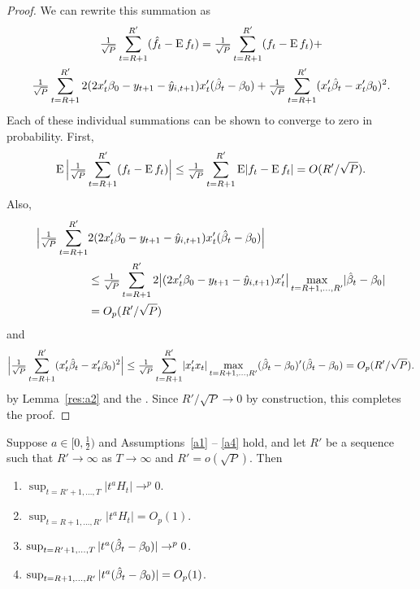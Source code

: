\documentclass[12pt,fleqn]{article}
\begin{document}
\begin{proof}
  We can rewrite this summation as
  \begin{multline*}
    \ocltc{t} (\fh_t - \E f_t) = \ocltc{t} (f_t - \E f_t) + \\
    \ocltc{t} 2 (2 x_t'\btrue - y_{t+1} - \yh_{i,t+1}) x_t'(\bh_t - \btrue)
    + \ocltc{t} (x_t'\bh_t - x_t'\btrue)^2.
  \end{multline*}
  Each of these individual summations can be shown to converge to
  zero in probability. First,
  \begin{equation*}
    \operatorname{E} \Big\lvert \tfrac{1}{\sqrt{P}} \sum_{t=R+1}^{R'} (f_t - \operatorname{E} f_t) \Big\rvert
    \leq \tfrac{1}{\sqrt{P}} \sum_{t=R+1}^{R'} \operatorname{E}\lvert f_t - \operatorname{E} f_t \rvert
    = O(R'/\sqrt{P}).
  \end{equation*}
  Also,
  \begin{align*}
    \Big\lvert \ocltc{t} &2 (2 x_t'\btrue - y_{t+1} - \yh_{i,t+1}) x_t'(\bh_t - \btrue) \Big\rvert \\
    &\leq \ocltc{t} 2 \big\lvert (2 x_t'\btrue - y_{t+1} - \yh_{i,t+1}) x_t' \big\rvert
    \max_{t=R+1,\dots,R'} \lvert  \bh_t - \btrue \rvert \\
    & = O_p(R'/\sqrt{P})
  \end{align*}
  and
  \begin{equation*}
    \Big\lvert \ocltc{t} (x_t'\bh_t - x_t'\btrue)^2 \Big\rvert
    \leq \ocltc{t} \lvert x_t'x_t \rvert \max_{t=R+1,\dots,R'} (\bh_t - \btrue)'(\bh_t - \btrue)
    = O_p(R'/\sqrt{P}).
  \end{equation*}
  by Lemma~\ref{res:a2} and the \lln. Since $R'/\sqrt{P} \to 0$ by
  construction, this completes the proof.
\end{proof}

\begin{alem}\label{res:a2}
  Suppose $a \in [0,\frac12)$ and Assumptions~\ref{a1} -- \ref{a4}
  hold, and let $R'$ be a sequence such that $R' \to \infty$ as $T \to
  \infty$ and $R' = o(\sqrt{P})$. Then
  \begin{enumerate}
  \item $\sup_{t=R'+1,\dots,T} | t^a H_t | \to^p 0$.
  \item $\sup_{t=R+1,\dots,R'} | t^a H_t | = O_p(1)$.
  \item $\sup_{t = R'+1,\dots,T} | t^a(\bh_t - \btrue) | \to^{p} 0$.
  \item $\sup_{t = R+1,\dots,R'} | t^a(\bh_t - \btrue) | = O_p(1)$.
  \end{enumerate}
\end{alem}
\end{document}
